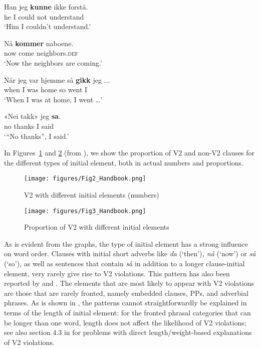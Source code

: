 \documentclass[output=paper]{langscibook}
\begin{document}
  \ex \gll Han jeg \textbf{kunne} ikke forstå.\\
    he    I    could   not   understand\\
\glt   ‘Him I couldn’t understand.’

  \ex \gll Nå \textbf{kommer} naboene.\\
    now come neighbors.\textsc{def}\\
\glt    ‘Now the neighbors are coming.’

  \ex \gll Når    jeg var  hjemme så \textbf{gikk}  jeg ...\\
    when I     was home     so went I\\
\glt    ‘When I was at home, I went …’

  \ex  \gll «Nei takk» jeg \textbf{sa}.\\
    no thanks I said\\
\glt    ‘“No thanks”, I said.’
\z
\z

In Figures~\ref{fig:anderssen:1} and \ref{fig:anderssen:2} (from \citealt[19]{WestergaardEtAl2021}), we show the proportion of V2 and non-V2 clauses for the different types of initial element, both in actual numbers and proportions.
    
\begin{figure}
\texttt{[image: figures/Fig2\_Handbook.png]}
\caption{V2 with different initial elements (numbers)}     
\label{fig:anderssen:1} 
\end{figure}

\begin{figure}
\texttt{[image: figures/Fig3\_Handbook.png]}
\caption{Proportion of V2 with different initial elements}
\label{fig:anderssen:2}
\end{figure}

As is evident from the graphs, the type of initial element has a strong influence on word order. Clauses with initial short adverbs like \textit{da} (‘then’)\textit{, nå} (‘now’) or \textit{så} (‘so’), as well as sentences that contain \textit{så} in addition to a longer clause\hyp initial element, very rarely give rise to V2 violations. This pattern has also been reported by \citet{EideHjelde2015Verb} and \citet{Johannessen2015Germanic}. The elements that are most likely to appear with V2 violations are those that are rarely fronted, namely embedded clauses, PPs, and adverbial phrases. As is shown in \citet{WestergaardEtAl2021}, the patterns cannot straightforwardly be explained in terms of the length of initial element: for the fronted phrasal categories that can be longer than one word, length does not affect the likelihood of V2 violations; see also section 4.3 in \citet{Khayitova2016} for problems with direct length/weight-based explanations of V2 violations.
\end{document}
